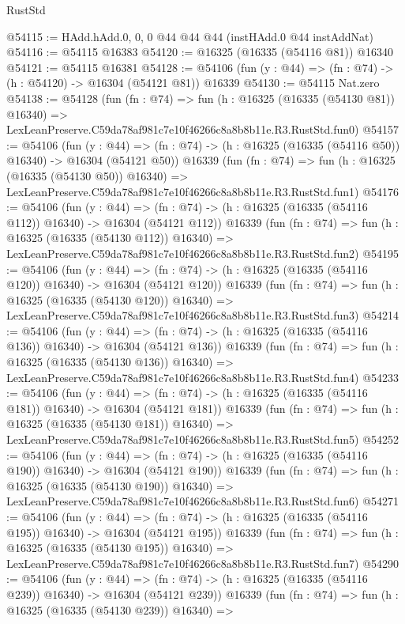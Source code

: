 \begin{lexlean}{RustStd}
\begin{coremodule}
@54115 := HAdd.hAdd.{0, 0, 0} @44 @44 @44 (instHAdd.{0} @44 instAddNat)
@54116 := @54115 @16383
@54120 := @16325 (@16335 (@54116 @81)) @16340
@54121 := @54115 @16381
@54128 := @54106 (fun (y : @44) => (fn : @74) -> (h : @54120) -> @16304 (@54121 @81)) @16339
@54130 := @54115 Nat.zero
@54138 := @54128
    (fun (fn : @74) =>
    fun (h : @16325 (@16335 (@54130 @81)) @16340) =>
    LexLeanPreserve.C59da78af981c7e10f46266c8a8b8b11e.R3.RustStd.fun0)
@54157 := @54106
    (fun (y : @44) =>
    (fn : @74) -> (h : @16325 (@16335 (@54116 @50)) @16340) -> @16304 (@54121 @50))
    @16339
    (fun (fn : @74) =>
    fun (h : @16325 (@16335 (@54130 @50)) @16340) =>
    LexLeanPreserve.C59da78af981c7e10f46266c8a8b8b11e.R3.RustStd.fun1)
@54176 := @54106
    (fun (y : @44) =>
    (fn : @74) -> (h : @16325 (@16335 (@54116 @112)) @16340) -> @16304 (@54121 @112))
    @16339
    (fun (fn : @74) =>
    fun (h : @16325 (@16335 (@54130 @112)) @16340) =>
    LexLeanPreserve.C59da78af981c7e10f46266c8a8b8b11e.R3.RustStd.fun2)
@54195 := @54106
    (fun (y : @44) =>
    (fn : @74) -> (h : @16325 (@16335 (@54116 @120)) @16340) -> @16304 (@54121 @120))
    @16339
    (fun (fn : @74) =>
    fun (h : @16325 (@16335 (@54130 @120)) @16340) =>
    LexLeanPreserve.C59da78af981c7e10f46266c8a8b8b11e.R3.RustStd.fun3)
@54214 := @54106
    (fun (y : @44) =>
    (fn : @74) -> (h : @16325 (@16335 (@54116 @136)) @16340) -> @16304 (@54121 @136))
    @16339
    (fun (fn : @74) =>
    fun (h : @16325 (@16335 (@54130 @136)) @16340) =>
    LexLeanPreserve.C59da78af981c7e10f46266c8a8b8b11e.R3.RustStd.fun4)
@54233 := @54106
    (fun (y : @44) =>
    (fn : @74) -> (h : @16325 (@16335 (@54116 @181)) @16340) -> @16304 (@54121 @181))
    @16339
    (fun (fn : @74) =>
    fun (h : @16325 (@16335 (@54130 @181)) @16340) =>
    LexLeanPreserve.C59da78af981c7e10f46266c8a8b8b11e.R3.RustStd.fun5)
@54252 := @54106
    (fun (y : @44) =>
    (fn : @74) -> (h : @16325 (@16335 (@54116 @190)) @16340) -> @16304 (@54121 @190))
    @16339
    (fun (fn : @74) =>
    fun (h : @16325 (@16335 (@54130 @190)) @16340) =>
    LexLeanPreserve.C59da78af981c7e10f46266c8a8b8b11e.R3.RustStd.fun6)
@54271 := @54106
    (fun (y : @44) =>
    (fn : @74) -> (h : @16325 (@16335 (@54116 @195)) @16340) -> @16304 (@54121 @195))
    @16339
    (fun (fn : @74) =>
    fun (h : @16325 (@16335 (@54130 @195)) @16340) =>
    LexLeanPreserve.C59da78af981c7e10f46266c8a8b8b11e.R3.RustStd.fun7)
@54290 := @54106
    (fun (y : @44) =>
    (fn : @74) -> (h : @16325 (@16335 (@54116 @239)) @16340) -> @16304 (@54121 @239))
    @16339
    (fun (fn : @74) =>
    fun (h : @16325 (@16335 (@54130 @239)) @16340) =>

\end{coremodule}
\end{lexlean}
